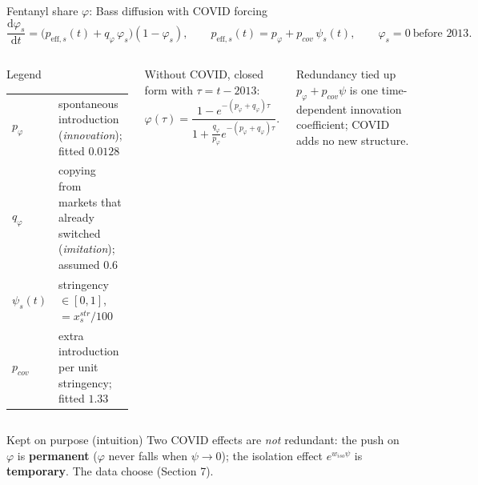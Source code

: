 ﻿\documentclass[9pt,aspectratio=169]{beamer}
\newenvironment{tied}{\begin{alertblock}{Redundancy tied up}\small}{\end{alertblock}}
\newenvironment{kept}{\begin{exampleblock}{Kept on purpose (intuition)}\small}{\end{exampleblock}}
\newenvironment{legend}{\begin{block}{Legend}\scriptsize}{\end{block}}
\newcommand{\dd}{\mathrm d}
\begin{document}
\begin{frame}{Fentanyl share $\varphi$: Bass diffusion with COVID forcing}
 \[
  \frac{\dd\varphi_s}{\dd t}=\big(p_{\mathrm{eff},s}(t)+q_\varphi\,\varphi_s\big)(1-\varphi_s),\qquad
  p_{\mathrm{eff},s}(t)=p_\varphi+p_{cov}\,\psi_s(t),\qquad \varphi_s=0\ \text{before }2013 .
 \]
 \begin{columns}[T]
 \begin{legend}
 \begin{tabular}{@{}p{1.0cm}p{6.2cm}@{}}
 $p_\varphi$ & spontaneous introduction (\emph{innovation}); fitted $0.0128$\\
 $q_\varphi$ & copying from markets that already switched (\emph{imitation}); assumed $0.6$\\
 $\psi_s(t)$ & stringency $\in[0,1]$, $=x^{str}_s/100$\\
 $p_{cov}$ & extra introduction per unit stringency; fitted $1.33$
 \end{tabular}
 \end{legend}
 Without COVID, closed form with $\tau=t-2013$:
 \[
  \varphi(\tau)=\frac{1-e^{-(p_\varphi+q_\varphi)\tau}}{1+\frac{q_\varphi}{p_\varphi}e^{-(p_\varphi+q_\varphi)\tau}} .
 \]
 \par\vspace{-2pt}
 \begin{tied}
  $p_\varphi+p_{cov}\psi$ is one time-dependent innovation coefficient; COVID adds no new structure.
 \end{tied}
 \end{columns}
 \begin{kept}
  Two COVID effects are \emph{not} redundant: the push on $\varphi$ is \textbf{permanent} ($\varphi$ never falls when $\psi\to0$); the isolation effect $e^{w_{iso}\psi}$ is \textbf{temporary}. The data choose (Section 7).
 \end{kept}
\end{frame}
\end{document}

